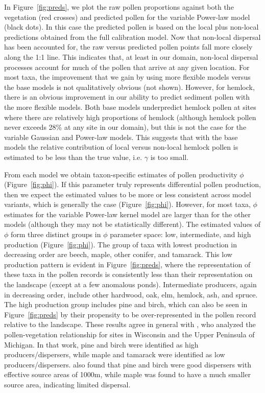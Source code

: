 \documentclass[12pt]{article}
\begin{document}
In Figure~\ref{fig:preds}, we plot the raw pollen proportions against
both the vegetation (red crosses) and predicted pollen for the
variable Power-law model (black dots). In this case the predicted
pollen is based on the local plus non-local predictions obtained from
the full calibration model. Now that non-local dispersal has been
accounted for, the raw versus predicted pollen points fall more
closely along the 1:1 line. This indicates that, at least in our
domain, non-local dispersal processes account for much of the pollen
that arrive at any given location. For most taxa, the improvement that
we gain by using more flexible models versus the base models is not
qualitatively obvious (not shown). However, for hemlock, there is an
obvious improvement in our ability to predict sediment pollen with the
more flexible models. Both base models underpredict hemlock pollen at
sites where there are relatively high proportions of hemlock (although
hemlock pollen never exceeds 28\% at any site in our domain), but this
is not the case for the variable Gaussian and Power-law models. This
suggests that with the base models the relative contribution of local
versus non-local hemlock pollen is estimated to be less than the true
value, i.e. $\gamma$ is too small.

From each model we obtain taxon-specific estimates of pollen
productivity $\phi$ (Figure~\ref{fig:phi}). If this parameter truly
represents differential pollen production, then we expect the
estimated values to be more or less consistent across model variants,
which is generally the case (Figure~\ref{fig:phi}). However, for most
taxa, $\phi$ estimates for the variable Power-law kernel model are
larger than for the other models (although they may not be
statistically different). The estimated values of $\phi$ form three
distinct groups in $\phi$ parameter space: low, intermediate, and high
production (Figure~\ref{fig:phi}). The group of taxa with lowest
production in decreasing order are beech, maple, other conifer, and
tamarack. This low production pattern is evident in
Figure~\ref{fig:preds}, where the representation of these taxa in the
pollen records is consistently less than their representation on the
landscape (except at a few anomalous ponds). Intermediate producers,
again in decreasing order, include other hardwood, oak, elm, hemlock,
ash, and spruce. The high production group includes pine and birch,
which can also be seen in Figure~\ref{fig:preds} by their propensity
to be over-represented in the pollen record relative to the
landscape. These results agree in general with \citep{prentice1986},
who analyzed the pollen-vegetation relationship for sites in Wisconsin
and the Upper Peninsula of Michigan. In that work, pine and birch were
identified as high producers/dispersers, while maple and tamarack were
identified as low producers/dispersers. \citep{jackson1990} also found
that pine and birch were good dispersers with effective source areas
of 1000m, while maple was found to have a much smaller source area,
indicating limited dispersal.
\end{document}
